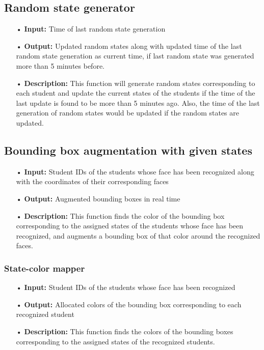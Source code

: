 \documentclass{scrreprt}
\begin{document}
\subsection{Random state generator}
\begin{enumerate}
\item[•] \textbf{Input:} Time of last random state generation
\item[•] \textbf{Output:} Updated random states along with updated time of the last random state generation as current
time, if last random state was generated more than 5 minutes before.
\item[•] \textbf{Description:} This function will generate random states corresponding to each student and
update the current states of the students if the time of the last update is found to be  more than 5 minutes
ago. Also, the time of the last generation of random states would be updated if the random states
are updated.
\end{enumerate}

\subsection{Bounding box augmentation with given states}
\begin{enumerate}
\item[•] \textbf{Input:} Student IDs of the students whose face has been recognized along with the coordinates of their
corresponding faces
\item[•] \textbf{Output:} Augmented bounding boxes in real time
\item[•] \textbf{Description:} This function finds the color of the bounding box corresponding to the assigned states of the students
whose face has been recognized, and augments a bounding box of that color around the recognized faces.
\end{enumerate}

\subsubsection{State-color mapper}
\begin{enumerate}
\item[•] \textbf{Input:} Student IDs of the students whose face has been recognized
\item[•] \textbf{Output:} Allocated colors of the bounding box corresponding to each recognized student
\item[•] \textbf{Description:} This function finds the colors of the bounding boxes corresponding to the assigned states of the
recognized students.
\end{enumerate}
\end{document}
